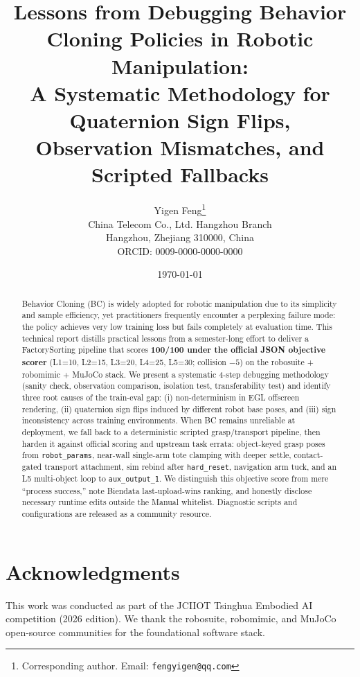 \documentclass[11pt,a4paper]{article}
\title{Lessons from Debugging Behavior Cloning Policies in Robotic Manipulation: \\
       A Systematic Methodology for Quaternion Sign Flips, \\
       Observation Mismatches, and Scripted Fallbacks}
\author{
  Yigen Feng\thanks{Corresponding author. Email: \texttt{fengyigen@qq.com}} \\
  China Telecom Co., Ltd. Hangzhou Branch \\
  Hangzhou, Zhejiang 310000, China \\
  ORCID: 0009-0000-0000-0000
}
\date{\today}
\newcommand{\code}[1]{\texttt{#1}}
\begin{document}
\maketitle

\begin{abstract}
Behavior Cloning (BC) is widely adopted for robotic manipulation due to its simplicity and sample efficiency, yet practitioners frequently encounter a perplexing failure mode: the policy achieves very low training loss but fails completely at evaluation time. This technical report distills practical lessons from a semester-long effort to deliver a FactorySorting pipeline that scores \textbf{100/100 under the official JSON objective scorer} (L1{=}10, L2{=}15, L3{=}20, L4{=}25, L5{=}30; collision $-5$) on the robosuite + robomimic + MuJoCo stack. We present a systematic 4-step debugging methodology (sanity check, observation comparison, isolation test, transferability test) and identify three root causes of the train-eval gap: (i) non-determinism in EGL offscreen rendering, (ii) quaternion sign flips induced by different robot base poses, and (iii) sign inconsistency across training environments. When BC remains unreliable at deployment, we fall back to a deterministic scripted grasp/transport pipeline, then harden it against official scoring and upstream task errata: object-keyed grasp poses from \code{robot\_params}, near-wall single-arm tote clamping with deeper settle, contact-gated transport attachment, sim rebind after \code{hard\_reset}, navigation arm tuck, and an L5 multi-object loop to \code{aux\_output\_1}. We distinguish this objective score from mere ``process success,'' note Biendata last-upload-wins ranking, and honestly disclose necessary runtime edits outside the Manual whitelist. Diagnostic scripts and configurations are released as a community resource.
\end{abstract}










\section*{Acknowledgments}
This work was conducted as part of the JCIIOT Tsinghua Embodied AI competition (2026 edition). We thank the robosuite, robomimic, and MuJoCo open-source communities for the foundational software stack.



\end{document}
